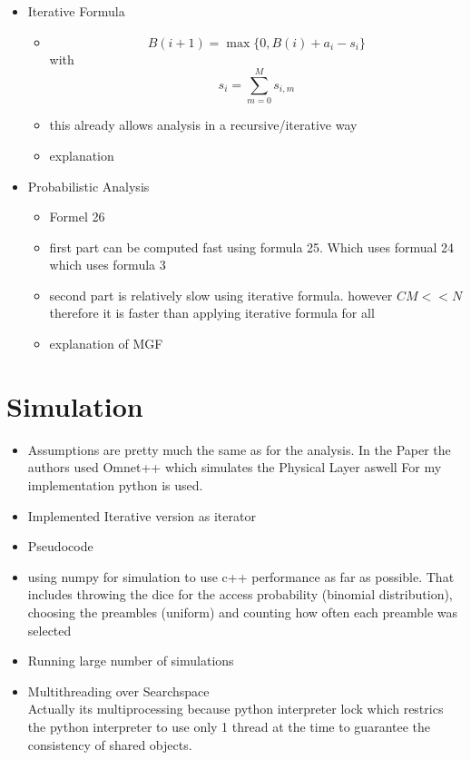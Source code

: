 \documentclass[conference]{IEEEtran}
\begin{document}
\begin{itemize}
\begin{itemize}
    \end{itemize}
    \item Iterative Formula
    \begin{itemize}
        \item \[B(i+1) = \max\{0, B(i)+a_i-s_i\}\] with \[s_i = \sum_{m=0}^Ms_{i,m}\]
        \item this already allows analysis in a recursive/iterative way
        \item explanation
    \end{itemize}
    \item Probabilistic Analysis
    \begin{itemize}
        \item Formel 26
        \item first part can be computed fast using formula 25. Which uses formual 24 which uses formula 3
        \item second part is relatively slow using iterative formula. however $CM<<N$
        therefore it is faster than applying iterative formula for all
        \item explanation of MGF
    \end{itemize}
\end{itemize}
\section{Simulation}
\begin{itemize}
    \item Assumptions
    are pretty much the same as for the analysis.
    In the Paper the authors used Omnet++ which simulates the Physical Layer aswell
    For my implementation python is used.
    \item Implemented Iterative version as iterator
    \item Pseudocode
    \item using numpy for simulation to use c++ performance as far as possible.
    That includes throwing the dice for the access probability (binomial distribution), choosing the preambles (uniform)
    and counting how often each preamble was selected
    \item Running large number of simulations
    \item Multithreading over Searchspace\\
    Actually its multiprocessing because python interpreter lock which restrics the python interpreter to use only
    1 thread at the time to guarantee the consistency of shared objects.
\end{itemize}
\end{document}
